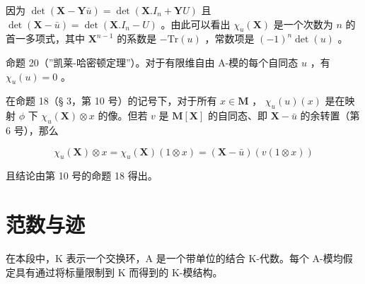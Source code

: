 因为 \(\operatorname{det}(\mathbf{X} - \mathbf{Y}\bar{u}) = \operatorname{det}(\mathbf{X}.I_n + \mathbf{Y}U)\) 且 \(\operatorname{det}(\mathbf{X} - \bar{u}) = \operatorname{det}(\mathbf{X}.I_n - U)\) 。由此可以看出 \(\chi_u(\mathbf{X})\) 是一个次数为 \(n\) 的首一多项式，其中 \(\mathbf{X}^{n-1}\) 的系数是 \(-\mathrm{Tr}(u)\) ，常数项是 \((-1)^n \operatorname{det}(u)\) 。

命题 20（”凯莱-哈密顿定理”）。对于有限维自由 A-模的每个自同态 \(u\) ，有 \(\chi_u(u) = 0\) 。

在命题 18（§ 3，第 10 号）的记号下，对于所有 \(x \in \mathbf{M}\) ， \(\chi_u(u)(x)\) 是在映射 \(\phi\) 下 \(\chi_u(\mathbf{X}) \otimes x\) 的像。但若 \(v\) 是 \(\mathbf{M}[\mathbf{X}]\) 的自同态、即 \(\mathbf{X} - \bar{u}\) 的余转置（第 6 号），那么

\[
\chi_ {u} (\mathbf {X}) \otimes x = \chi_ {u} (\mathbf {X}) (1 \otimes x) = (\mathbf {X} - \bar {u}) (v (1 \otimes x))
\]

且结论由第 10 号的命题 18 得出。

\section{范数与迹}

在本段中，K 表示一个交换环，A 是一个带单位的结合 K-代数。每个 A-模均假定具有通过将标量限制到 K 而得到的 K-模结构。
